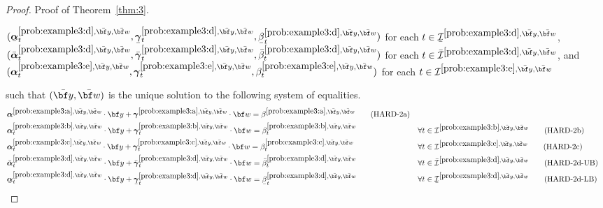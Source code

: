 \documentclass[nonblindrev,mnsc]{informs3} %
\newcommand{\bw}{{\bf w}}
\newcommand{\by}{{\bf y}}
\newcommand{\balpha}{{\boldsymbol{\alpha}}}
\newcommand{\bgamma}{{\boldsymbol{\gamma}}}
\newcommand{\ubar}[1]{\text{\b{$#1$}}}
\begin{document}
\begin{APPENDICES}
\begin{proof}{Proof of Theorem~\ref{thm:3}.}
\begin{itemize}
$(\ubar{\balpha}^{\ref{prob:example3:d},\bar{\by},\bar{\bw}}_{t},\ubar{\bgamma}^{\ref{prob:example3:d},\bar{\by},\bar{\bw}}_{t},\ubar{\beta}^{\ref{prob:example3:d},\bar{\by},\bar{\bw}}_{t})$ for each $t \in \ubar{\mathcal{I}}^{\ref{prob:example3:d},\bar{\by},\bar{\bw}}$, $(\bar{\balpha}^{\ref{prob:example3:d},\bar{\by},\bar{\bw}}_{t},\bar{\bgamma}^{\ref{prob:example3:d},\bar{\by},\bar{\bw}}_{t}, \bar{\beta}^{\ref{prob:example3:d},\bar{\by},\bar{\bw}}_{t})$ for each $t \in \bar{\mathcal{I}}^{\ref{prob:example3:d},\bar{\by},\bar{\bw}}$, and  $(\balpha_t^{\ref{prob:example3:e},\bar{\by},\bar{\bw}},\bgamma_t^{\ref{prob:example3:e},\bar{\by},\bar{\bw}},\beta_t^{\ref{prob:example3:e},\bar{\by},\bar{\bw}})$ for each $t \in {\mathcal{I}}^{\ref{prob:example3:e},\bar{\by},\bar{\bw}}$
\end{itemize}
such that $(\bar{\by},\bar{\bw})$ is the unique solution to  the following system of equalities. %
\begin{align}
&\balpha^{\ref{prob:example3:a},\bar{\by},\bar{\bw}} \cdot \by + \bgamma^{\ref{prob:example3:a},\bar{\by},\bar{\bw}} \cdot \bw = \beta^{\ref{prob:example3:a},\bar{\by},\bar{\bw}}  \tag{HARD-2a} \label{prob:example3:a1} \\
 &\balpha^{\ref{prob:example3:b},\bar{\by},\bar{\bw}}_t \cdot \by + \bgamma^{\ref{prob:example3:b},\bar{\by},\bar{\bw}}_t \cdot \bw = \beta^{\ref{prob:example3:b},\bar{\by},\bar{\bw}}_t && \forall t \in \mathcal{I}^{\ref{prob:example3:b},\bar{\by},\bar{\bw}}\tag{HARD-2b} \label{prob:example3:b1}\\
 &\balpha^{\ref{prob:example3:c},\bar{\by},\bar{\bw}}_t \cdot \by + \bgamma^{\ref{prob:example3:c},\bar{\by},\bar{\bw}}_t \cdot \bw = \beta^{\ref{prob:example3:c},\bar{\by},\bar{\bw}}_t && \forall t \in \mathcal{I}^{\ref{prob:example3:c},\bar{\by},\bar{\bw}}\tag{HARD-2c} \label{prob:example3:c1}\\
&\bar{\balpha}^{\ref{prob:example3:d},\bar{\by},\bar{\bw}}_{t} \cdot \by + \bar{\bgamma}^{\ref{prob:example3:d},\bar{\by},\bar{\bw}}_{t} \cdot \bw = \bar{\beta}^{\ref{prob:example3:d},\bar{\by},\bar{\bw}}_{t} && \forall t \in  \bar{\mathcal{I}}^{\ref{prob:example3:d},\bar{\by},\bar{\bw}}  \tag{HARD-2d-UB} \label{prob:example3:d1UB}\\
&\ubar{\balpha}^{\ref{prob:example3:d},\bar{\by},\bar{\bw}}_{t} \cdot \by + \ubar{\bgamma}^{\ref{prob:example3:d},\bar{\by},\bar{\bw}}_{t} \cdot \bw = \ubar{\beta}^{\ref{prob:example3:d},\bar{\by},\bar{\bw}}_{t} && \forall t \in  \ubar{\mathcal{I}}^{\ref{prob:example3:d},\bar{\by},\bar{\bw}}   \tag{HARD-2d-LB} \label{prob:example3:d1LB}\\

\end{align}
\end{proof}
\end{APPENDICES}
\end{document}
